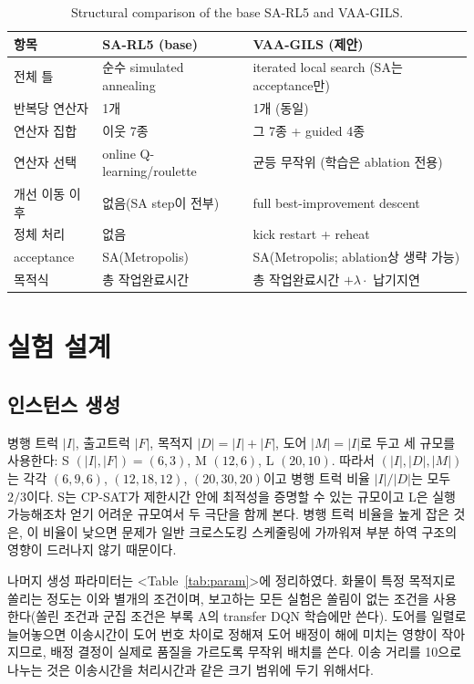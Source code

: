 \documentclass[10pt,a4paper]{article}
\begin{document}
\begin{table}[H]\centering
\caption{Structural comparison of the base SA-RL5 and VAA-GILS.}\label{tab:base}\small
\begin{tabular}{@{}p{}p{}p{}@{}}
\toprule
항목 & SA-RL5 (base) & VAA-GILS (제안) \\
\midrule
전체 틀 & 순수 simulated annealing & iterated local search (SA는 acceptance만) \\
반복당 연산자 & 1개 & 1개 (동일) \\
연산자 집합 & 이웃 7종 & 그 7종 + guided 4종 \\
연산자 선택 & online Q-learning/roulette & 균등 무작위 (학습은 ablation 전용) \\
개선 이동 이후 & 없음(SA step이 전부) & full best-improvement descent \\
정체 처리 & 없음 & kick restart + reheat \\
acceptance & SA(Metropolis) & SA(Metropolis; ablation상 생략 가능) \\
목적식 & 총 작업완료시간 & 총 작업완료시간 $+\lambda\cdot$ 납기지연 \\
\bottomrule
\end{tabular}
\end{table}

\section{실험 설계}

\subsection{인스턴스 생성}
병행 트럭 $|I|$, 출고트럭 $|F|$, 목적지 $|D|=|I|+|F|$, 도어 $|M|=|I|$로 두고 세 규모를
사용한다: S $(|I|,|F|)=(6,3)$, M $(12,6)$, L $(20,10)$. 따라서 $(|I|,|D|,|M|)$는 각각
$(6,9,6)$, $(12,18,12)$, $(20,30,20)$이고 병행 트럭 비율 $|I|/|D|$는 모두 $2/3$이다. S는
CP-SAT가 제한시간 안에 최적성을 증명할 수 있는 규모이고 L은 실행 가능해조차 얻기 어려운
규모여서 두 극단을 함께 본다. 병행 트럭 비율을 높게 잡은 것은, 이 비율이 낮으면 문제가
일반 크로스도킹 스케줄링에 가까워져 부분 하역 구조의 영향이 드러나지 않기 때문이다.

나머지 생성 파라미터는 <Table~\ref{tab:param}>에 정리하였다. 화물이 특정 목적지로
쏠리는 정도는 이와 별개의 조건이며, 보고하는 모든 실험은 쏠림이 없는 조건을 사용한다(쏠린
조건과 군집 조건은 부록 A의 transfer DQN 학습에만 쓴다). 도어를 일렬로 늘어놓으면
이송시간이 도어 번호 차이로 정해져 도어 배정이 해에 미치는 영향이 작아지므로, 배정
결정이 실제로 품질을 가르도록 무작위 배치를 쓴다. 이송 거리를 10으로 나누는 것은
이송시간을 처리시간과 같은 크기 범위에 두기 위해서다.
\end{document}
